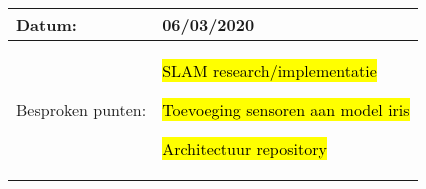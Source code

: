 \begin{tabularx}{\textwidth}{| l | X |}
  \hline
  Datum: & 06/03/2020\\
  \hline
  Besproken punten: &
  \begin{compactitem}
    \item \hl{SLAM research/implementatie}
    \item \hl{Toevoeging sensoren aan model iris}
    \item \hl{Architectuur repository}
  \end{compactitem}\\
  \hline
\end{tabularx}